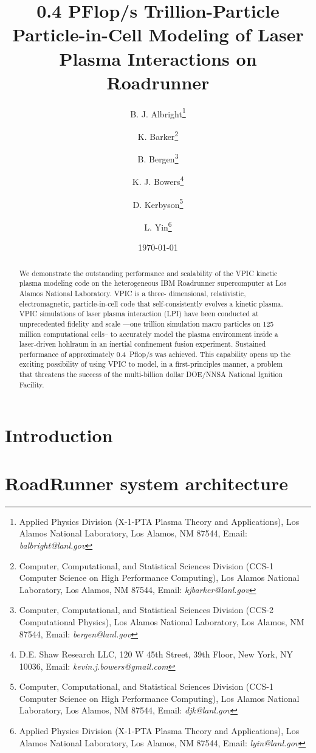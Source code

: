 \documentclass[letter,10pt]{article}
\title{0.4 PFlop/s Trillion-Particle Particle-in-Cell Modeling of Laser Plasma Interactions on Roadrunner}
\author{%
B. J. Albright\thanks{Applied Physics Division (X-1-PTA Plasma Theory and Applications), Los Alamos National Laboratory, Los Alamos, NM 87544, Email: \emph{balbright@lanl.gov}} \and%
%
K. Barker\thanks{Computer, Computational, and Statistical Sciences Division (CCS-1 Computer Science on High Performance Computing), Los Alamos National Laboratory, Los Alamos, NM 87544, Email: \emph{kjbarker@lanl.gov}} \and%
%
B. Bergen\thanks{Computer, Computational, and Statistical Sciences Division (CCS-2 Computational Physics), Los Alamos National Laboratory, Los Alamos, NM 87544, Email: \emph{bergen@lanl.gov}} \and%
%
K. J. Bowers\thanks{D.E. Shaw Research LLC, 120 W 45th Street, 39th Floor, New York, NY 10036, Email: \emph{kevin.j.bowers@gmail.com}} \and%
%
D. Kerbyson\thanks{Computer, Computational, and Statistical Sciences Division (CCS-1 Computer Science on High Performance Computing), Los Alamos National Laboratory, Los Alamos, NM 87544, Email: \emph{djk@lanl.gov}} \and%
%
L. Yin\thanks{Applied Physics Division (X-1-PTA Plasma Theory and Applications), Los Alamos National Laboratory, Los Alamos, NM 87544, Email: \emph{lyin@lanl.gov}}}
\date{\today}
\begin{document}
\maketitle
\thispagestyle{empty}

\begin{abstract}
We demonstrate the outstanding performance and scalability of the VPIC 
kinetic plasma modeling code on the heterogeneous IBM Roadrunner 
supercomputer at Los Alamos National Laboratory.  VPIC is a three-
dimensional, relativistic, electromagnetic, particle-in-cell code that 
self-consistently evolves a kinetic plasma.  VPIC simulations of laser 
plasma interaction (LPI) have been conducted at unprecedented fidelity 
and scale ---one trillion simulation macro particles on 125 million 
computational cells-- to accurately model the plasma environment 
inside a laser-driven hohlraum in an inertial confinement fusion 
experiment.   Sustained performance of approximately 0.4~Pflop/s was 
achieved.  This capability opens up the exciting possibility of using 
VPIC to model, in a first-principles manner, a problem that threatens 
the success of the multi-billion dollar DOE/NNSA National Ignition Facility.  
\end{abstract}

\pagebreak

\section*{Introduction}

\section*{RoadRunner system architecture}
\end{document}
